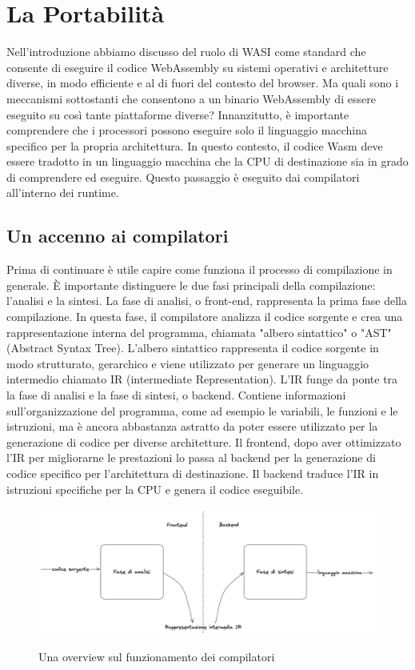 \section{La Portabilità}
Nell'introduzione abbiamo discusso del ruolo di WASI come standard che consente di eseguire il codice WebAssembly su
sistemi operativi e architetture diverse, in modo efficiente e al di fuori del contesto del browser. Ma quali sono i
meccanismi sottostanti che consentono a un binario WebAssembly di essere eseguito su così tante piattaforme diverse?
Innanzitutto, è importante comprendere che i processori possono eseguire solo il linguaggio macchina specifico per la
propria architettura. In questo contesto, il codice Wasm deve essere tradotto in un linguaggio macchina che la CPU di
destinazione sia in grado di comprendere ed eseguire. Questo passaggio è eseguito dai compilatori all'interno dei
runtime.

\subsection{Un accenno ai compilatori}
Prima di continuare è utile capire come funziona il processo di compilazione in generale\cite{compilers-foundamentals}.
È importante distinguere le due fasi principali della compilazione: l'analisi e la sintesi. La fase di analisi, o
front-end, rappresenta la prima fase della compilazione. In questa fase, il compilatore analizza il codice sorgente e
crea una rappresentazione interna del programma, chiamata "albero sintattico" o "AST" (Abstract Syntax Tree). L'albero
sintattico rappresenta il codice sorgente in modo strutturato, gerarchico e viene utilizzato per generare un linguaggio
intermedio chiamato IR (intermediate Representation). L'IR funge da ponte tra la fase di analisi e la fase di sintesi, o
backend. Contiene informazioni sull'organizzazione del programma, come ad esempio le variabili, le funzioni e le
istruzioni, ma è ancora abbastanza astratto da poter essere utilizzato per la generazione di codice per diverse
architetture. Il frontend, dopo aver ottimizzato l'IR per migliorarne le prestazioni lo passa al backend per la
generazione di codice specifico per l'architettura di destinazione. Il backend traduce l'IR in istruzioni specifiche per
la CPU e genera il codice eseguibile.

\begin{figure}[H]
    \centering
    \captionsetup{justification=centering}
    \includegraphics[width=15cm]{./chapters/2.wasi-in-depth/images/7.how_compilers_work.png}
    \label{how_compilers_work_simplified}
    \caption{Una overview sul funzionamento dei compilatori}
\end{figure}

